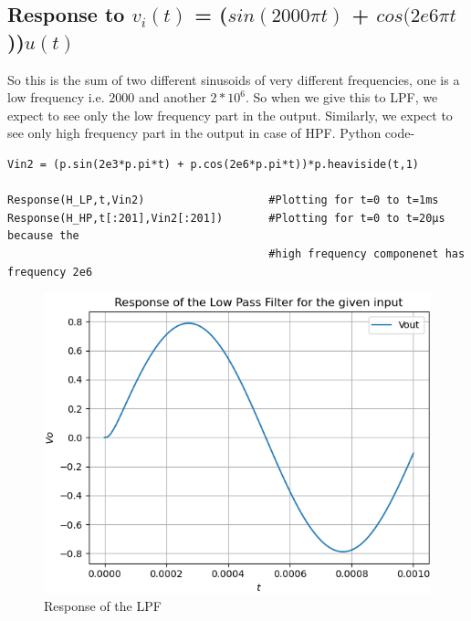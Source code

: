 \documentclass[11pt, a4paper]{article}
\begin{document}
\subsection{Response to $v_i(t)$ = ($sin(2000\pi t)$ + $cos(2e6\pi t$))$u(t)$}
    So this is the sum of two different sinusoids of very different frequencies, one is a low frequency i.e. $2000$ and another $2*10^6$. So when we give this to LPF, we expect to see only the low frequency part in the output. Similarly, we expect to see only high frequency part in the output in case of HPF. Python code-
    \begin{verbatim}
Vin2 = (p.sin(2e3*p.pi*t) + p.cos(2e6*p.pi*t))*p.heaviside(t,1)

Response(H_LP,t,Vin2)                   #Plotting for t=0 to t=1ms
Response(H_HP,t[:201],Vin2[:201])       #Plotting for t=0 to t=20µs because the
                                        #high frequency componenet has frequency 2e6
    \end{verbatim}
    \begin{figure}[!h]
        \centering
        \includegraphics[scale = 0.65]{Figure 5.png}
        \caption{Response of the LPF}
        \label{fig:Figure 5}
    \end{figure}
\end{document}
